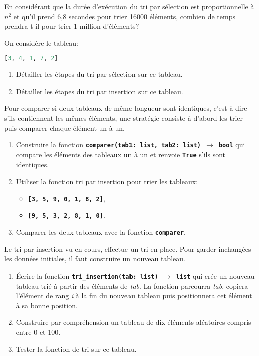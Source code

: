 \documentclass[a4paper,11pt]{article}
\begin{document}
\begin{exo}
En considérant que la durée d'exécution du tri par sélection est proportionnelle à $n^2$ et qu'il prend 6,8 secondes pour trier 16000 éléments, combien de temps prendra-t-il pour trier 1 million d'éléments?
\end{exo}
\begin{exo}
    On considère le tableau:
    \begin{center}
    \begin{lstlisting}[language=Python]
    [3, 4, 1, 7, 2]
    \end{lstlisting}
    \end{center}
\begin{enumerate}
    \item Détailler les étapes du tri par sélection sur ce tableau.
    \item Détailler les étapes du tri par insertion sur ce tableau.
\end{enumerate}
\end{exo}
\begin{exo}
Pour comparer si deux tableaux de même longueur sont identiques, c’est-à-dire s'ils contiennent les mêmes éléments, une stratégie consiste à d'abord les trier puis comparer chaque élément un à un.
\begin{enumerate}
    \item Construire la fonction \textbf{\texttt{comparer(tab1: list, tab2: list) $\rightarrow$ bool}} qui compare les éléments des tableaux un à un et renvoie \textbf{\texttt{True}} s'ils sont identiques.
    \item Utiliser la fonction tri par insertion pour trier les tableaux:
    \begin{itemize}
        \item \textbf{\texttt{[3, 5, 9, 0, 1, 8, 2]}},
        \item \textbf{\texttt{[9, 5, 3, 2, 8, 1, 0]}}.
    \end{itemize}
    \item Comparer les deux tableaux avec la fonction \textbf{\texttt{comparer}}.
\end{enumerate}
\end{exo}
\begin{exo}
Le tri par insertion vu en cours, effectue un tri en place. Pour garder inchangées les données initiales, il faut construire un nouveau tableau.
\begin{enumerate}
    \item Écrire la fonction \textbf{\texttt{tri\_insertion(tab: list) $\rightarrow$ list}} qui crée un nouveau tableau trié à partir des éléments de \emph{tab}. La fonction parcourra \emph{tab}, copiera l'élément de rang \emph{i} à la fin du nouveau tableau puis positionnera cet élément à sa bonne position.
    \item Construire par compréhension un tableau de dix éléments aléatoires compris entre 0 et 100.
    \item Tester la fonction de tri sur ce tableau.
\end{enumerate}
\end{exo}
\end{document}
